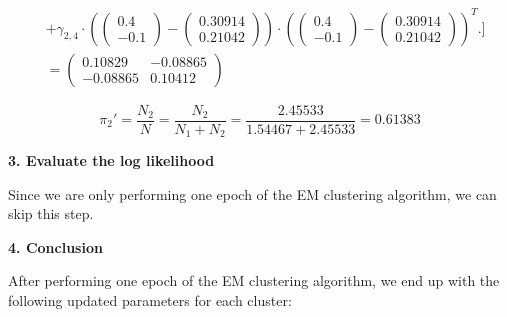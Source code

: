 \documentclass[12pt]{article}
\begin{document}
\begin{enumerate}[leftmargin=\labelsep]
\begin{align*}
                        & + \gamma_{2,4} \cdot \left(\begin{pmatrix} 0.4 \\ -0.1 \end{pmatrix} - \begin{pmatrix} 0.30914 \\ 0.21042 \end{pmatrix}\right) \cdot \left(\begin{pmatrix} 0.4 \\ -0.1 \end{pmatrix} - \begin{pmatrix} 0.30914 \\ 0.21042 \end{pmatrix}\right)^T
                        \Bigg. \Bigg] \\
                        & = \begin{pmatrix} 0.10829 & -0.08865 \\ -0.08865 & 0.10412 \end{pmatrix}
          \end{align*}
          \endgroup

          \begin{equation*}
              \pi_2' = \frac{N_2}{N} = \frac{N_2}{N_1 + N_2} = \frac{2.45533}{1.54467 + 2.45533} = 0.61383
          \end{equation*}

          \vskip 0.2cm
          \begin{large}\textbf{3. Evaluate the log likelihood}\end{large}
          \vskip 0.1cm

          Since we are only performing one epoch of the EM clustering algorithm, we can skip this step.

          \vskip 0.2cm
          \begin{large}\textbf{4. Conclusion}\end{large}
          \vskip 0.1cm

          After performing one epoch of the EM clustering algorithm, we end up with the following updated parameters for each cluster:


\end{enumerate}
\end{document}
